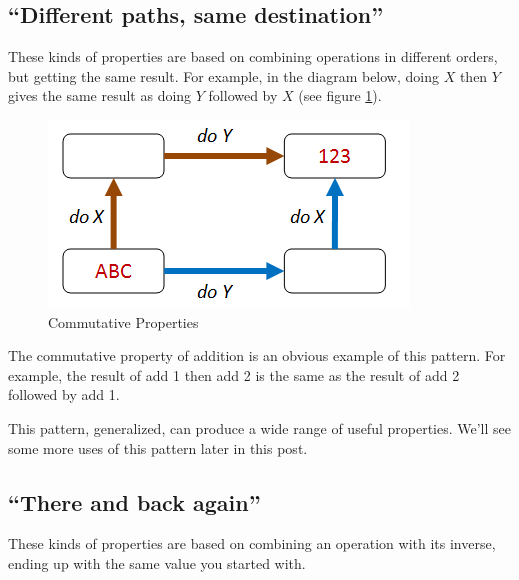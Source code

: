 \subsection{``Different paths, same destination''}
\label{sec:different_paths_same_destination}

These kinds of properties are based on combining operations in different orders, but getting the same result. For example, in the diagram below, doing $X$ then $Y$ gives the same result as doing $Y$ followed by $X$ (see figure \ref{fig:choosing_properties_1}).
\begin{figure}[htbp]
 \centering
 \includegraphics[width=.95\linewidth]{./pics/choosing_properties_1.png}
 \caption{Commutative Properties}
 \label{fig:choosing_properties_1}
\end{figure}
The commutative property of addition is an obvious example of this pattern. For example, the result of add 1 then add 2 is the same as the result of add 2 followed by add 1.

This pattern, generalized, can produce a wide range of useful properties. We'll see some more uses of this pattern later in this post.


\subsection{``There and back again''}
\label{sec:there_and_back_again}

These kinds of properties are based on combining an operation with its inverse, ending up with the same value you started with.

